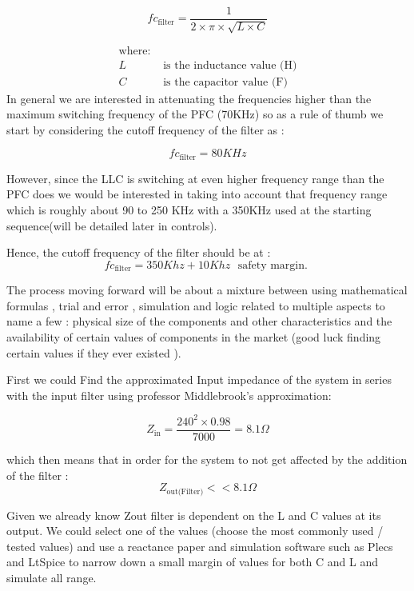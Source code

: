 \documentclass{article}
\begin{document}
\[
fc_{\text{filter}} =  \frac{1}{2\times\pi\times\sqrt{L\times C}}
\]

\begin{align*}
\text{where:} \\
 L &\text{ is the inductance value (H)} \\
 C &\text{ is the capacitor value (F}\text{)}
\end{align*}
In general we are interested in attenuating the frequencies higher than the maximum switching frequency of the PFC (70KHz) so as a rule of thumb we start by considering the cutoff frequency of the filter as :

\[
fc_{\text{filter}} =  80 KHz
\]

However, since the LLC is switching at even higher frequency range than the PFC does we would be interested in taking into account that frequency range which is roughly about 90 to 250 KHz with a 350KHz used at the starting sequence(will be detailed later in controls).

Hence, the cutoff frequency of the filter should be at :
\[
fc_{\text{filter}} =  350 Khz + 10Khz \text{ } \text{safety margin. } 
\]

The process moving forward will be about a mixture between using mathematical formulas , trial and error , simulation and logic related to multiple aspects to name a few : physical size of the components and other characteristics and the availability of certain values of components in the market (good luck finding certain values if they ever existed ).

First we could Find the approximated Input impedance of the system in series with the input filter using professor Middlebrook's approximation:

\[
Z_{\text{in}} =  \frac{240^2\times 0.98}{7000} = 8.1 \textbf{$\Omega$}
\]

which then means that in order for the system to not get affected by the addition of the filter : 
\[Z_{\text{out(Filter)}} << 8.1 \textbf{$\Omega$}\]

Given we already know Zout filter is dependent on the L and C values at its output. We could select one of the values (choose the most commonly used / tested values) and use a reactance paper and simulation software such as Plecs and LtSpice to narrow down a small margin of values for both C and L and simulate all range.





\end{document}
